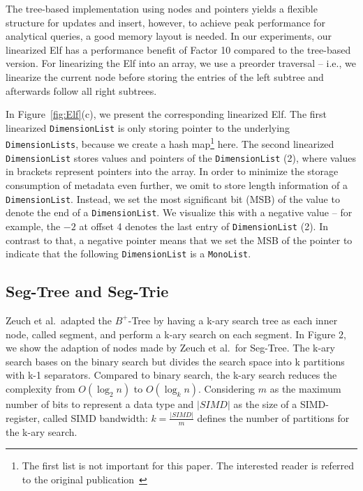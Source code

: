 \documentclass[runningheads,a4paper]{llncs}
\begin{document}
The tree-based implementation using nodes and pointers yields a flexible structure for updates and insert, however, to achieve peak performance for analytical queries, a good memory layout is needed. In our experiments, our linearized Elf has a performance benefit of Factor 10 compared to the tree-based version. For linearizing the Elf into an array, we use a preorder traversal -- i.e., we linearize the current node before storing the entries of the left subtree and afterwards follow all right subtrees.

In Figure~\ref{fig:Elf}(c), we present the corresponding linearized Elf. The first linearized \verb.DimensionList. is only storing pointer to the underlying \verb.DimensionLists., because we create a hash map\footnote{The first list is not important for this paper. The interested reader is referred to the original publication~\cite{BKS+17}} here. The second linearized \verb.DimensionList. stores values and pointers of the \verb.DimensionList. (2), where values in brackets represent pointers into the array. In order to minimize the storage consumption of metadata even further, we omit to store length information of a \verb.DimensionList.. Instead, we set the most significant bit (MSB) of the value to denote the end of a \verb.DimensionList.. We visualize this with a negative value -- for example, the $-2$ at offset 4 denotes the last entry of \verb.DimensionList. (2). In contrast to that, a negative pointer means that we set the MSB of the pointer to indicate that the following \verb.DimensionList. is a \verb.MonoList..





\subsection{Seg-Tree and Seg-Trie}\label{SCM}
Zeuch et al.\ adapted the $B^+$-Tree by having a k-ary search tree as each inner node, called segment, and perform a k-ary search on each segment.  In Figure 2, we show the adaption of nodes made by Zeuch et al.\ for Seg-Tree. The k-ary search bases on the binary search but divides the search space into k partitions with k-1 separators. Compared to binary search, the k-ary search reduces the complexity from $O(\log_{2}{n})$ to $O(\log_{k}{n})$. Considering $m$ as the maximum number of bits to represent a data type and $\vert SIMD \vert$ as the size of a SIMD-register, called SIMD bandwidth: $k = \frac{\vert SIMD \vert }{m}$ defines the number of partitions for the k-ary search. 
\end{document}
